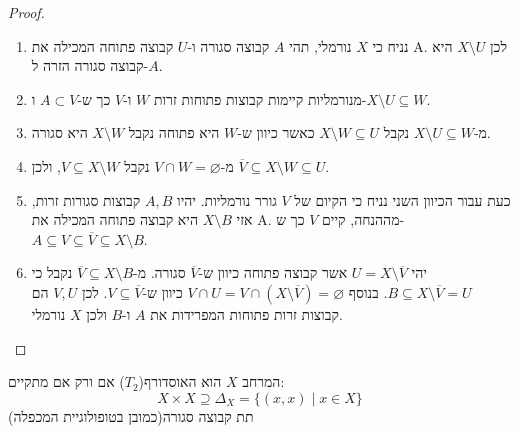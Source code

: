 \documentclass{tstextbook}
\begin{document}
\begin{proof}
  \begin{enumerate}
    \item נניח כי \(X\) נורמלי, תהי \(A\) קבוצה סגורה ו-\(U\) קבוצה פתוחה המכילה את A. לכן \(X\setminus U\) היא קבוצה סגורה הזרה ל-\(A\). 


    \item מנורמליות קיימות קבוצות פתוחות זרות \(W\) ו-\(V\) כך ש-\(A \subset V\) ו-\(X \setminus U \subseteq W\). 


    \item מ-\(X\setminus U \subseteq W\) נקבל \(X\setminus W\subseteq U\) כאשר כיוון ש-\(W\) היא פתוחה נקבל \(X\setminus W\) היא סגורה. 


    \item מ-\(V\cap W=\varnothing\) נקבל \(V\subseteq X \setminus W\), ולכן \(\overline{V}\subseteq X \setminus W\subseteq U\). 


    \item כעת עבור הכיוון השני נניח כי הקיום של \(V\) גורר נורמליות. יהיו \(A,B\) קבוצות סגורות זרות, אזי \(X\setminus B\) היא קבוצה פתוחה המכילה את A. מההנחה, קיים \(V\) כך ש-\(A\subseteq V\subseteq \overline{ V}\subseteq X\setminus B\).  


    \item יהי \(U=X \setminus \overline{V}\) אשר קבוצה פתוחה כיוון ש-\(\overline{ V}\) סגורה. מ-\(\overline{V}\subseteq X \setminus B\) נקבל כי \(B\subseteq X\setminus \overline{ V}=U\). בנוסף \(V\cap U = V\cap(X \setminus \overline{ V})=\varnothing\) כיוון ש-\(V\subseteq \overline{ V}\). לכן \(V,U\) הם קבוצות זרות פתוחות המפרידות את \(A\) ו-\(B\) ולכן \(X\) נורמלי. 


  \end{enumerate}
\end{proof}
\begin{proposition}
המרחב \(X\) הוא האוסדורף(\(T_{2}\)) אם ורק אם מתקיים:
$$X\times X\supseteq \Delta_{X}=\{ (x,x)\mid x \in X \}$$
תת קבוצה סגורה(כמובן בטופולוגיית המכפלה)

\end{proposition}
\end{document}
